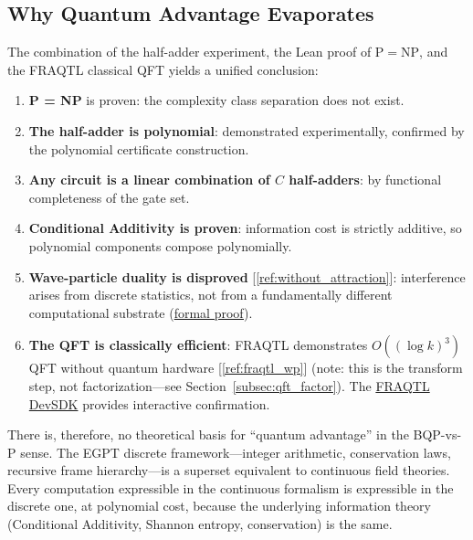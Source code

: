 \documentclass[11pt,a4paper]{article}
\begin{document}
\subsection{Why Quantum Advantage Evaporates}

The combination of the half-adder experiment, the Lean proof of $\mathrm{P} = \mathrm{NP}$, and the FRAQTL classical QFT yields a unified conclusion:

\begin{enumerate}
    \item \textbf{P = NP} is proven: the complexity class separation does not exist.
    \item \textbf{The half-adder is polynomial}: demonstrated experimentally, confirmed by the polynomial certificate construction.
    \item \textbf{Any circuit is a linear combination of $C$ half-adders}: by functional completeness of the gate set.
    \item \textbf{Conditional Additivity is proven}: information cost is strictly additive, so polynomial components compose polynomially.
    \item \textbf{Wave-particle duality is disproved} [\ref{ref:without_attraction}]: interference arises from discrete statistics, not from a fundamentally different computational substrate (\href{https://eabadir.github.io/EGPT/Lean/PPNP/Proofs/WaveParticleDualityDisproved.lean}{formal proof}).
    \item \textbf{The QFT is classically efficient}: FRAQTL demonstrates $O((\log k)^3)$ QFT without quantum hardware [\ref{ref:fraqtl_wp}] (note: this is the transform step, not factorization---see Section~\ref{subsec:qft_factor}). The \href{https://eabadir.github.io/EGPT/www/fraqtl_devsdk/index.html}{FRAQTL DevSDK} provides interactive confirmation.
\end{enumerate}

There is, therefore, no theoretical basis for ``quantum advantage'' in the BQP-vs-P sense. The EGPT discrete framework---integer arithmetic, conservation laws, recursive frame hierarchy---is a superset equivalent to continuous field theories. Every computation expressible in the continuous formalism is expressible in the discrete one, at polynomial cost, because the underlying information theory (Conditional Additivity, Shannon entropy, conservation) is the same.


\end{document}

